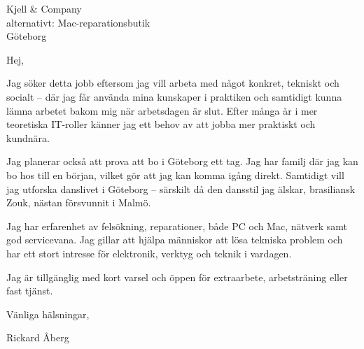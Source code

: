\documentclass[a4paper,10pt]{letter}
\begin{document}
\begin{letter}{Kjell \& Company \\ alternativt: Mac-reparationsbutik \\ Göteborg}
\opening{Hej,}

Jag söker detta jobb eftersom jag vill arbeta med något konkret, tekniskt och socialt – där jag får använda mina kunskaper i praktiken och samtidigt kunna lämna arbetet bakom mig när arbetsdagen är slut. Efter många år i mer teoretiska IT-roller känner jag ett behov av att jobba mer praktiskt och kundnära.

Jag planerar också att prova att bo i Göteborg ett tag. Jag har familj där jag kan bo hos till en början, vilket gör att jag kan komma igång direkt. Samtidigt vill jag utforska danslivet i Göteborg – särskilt då den dansstil jag älskar, brasiliansk Zouk, nästan försvunnit i Malmö.

Jag har erfarenhet av felsökning, reparationer, både PC och Mac, nätverk samt god servicevana. Jag gillar att hjälpa människor att lösa tekniska problem och har ett stort intresse för elektronik, verktyg och teknik i vardagen.

Jag är tillgänglig med kort varsel och öppen för extraarbete, arbetsträning eller fast tjänst.

\closing{Vänliga hälsningar,}

\vspace{1em}

Rickard Åberg\\
[0709431401] \\
[raberg@duck.com]

\end{letter}
\end{document}
